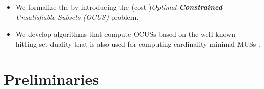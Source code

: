 \documentclass{llncs}
\newcommand\comment[1]{\marginpar{\tiny #1}}
\renewcommand\comment[1]{#1}
\newcommand{\emilio}[1]{{\comment{\color{red}Emilio: #1}}}
\begin{document}
\begin{itemize}
	\item We formalize the by introducing the (cost-)\emph{Optimal \textbf{Constrained} Unsatisfiable Subsets (OCUS)} problem.
	\item We develop algorithms that compute OCUSs based on the well-known hitting-set duality that is also used for computing cardinality-minimal MUSs \cite{ignatiev2015smallest,DBLP:conf/kr/SaikkoWJ16}.
	
	
%
%


\end{itemize}

\section{Preliminaries}
\end{document}
